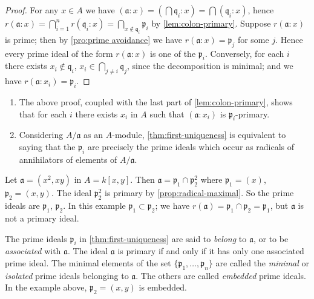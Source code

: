 \begin{proof}
    For any $x \in A$ we have $(\mathfrak{a} : x) = \left(\bigcap \mathfrak{q}_i : x\right) = \bigcap (\mathfrak{q}_i : x)$, hence $r(\mathfrak{a} : x) = \bigcap_{i=1}^n r(\mathfrak{q}_i : x) = \bigcap_{x \notin \mathfrak{q}_i} \mathfrak{p}_i$ by \eqref{lem:colon-primary}. Suppose $r(\mathfrak{a} : x)$ is prime; then by \eqref{pro:prime avoidance} we have $r(\mathfrak{a} : x) = \mathfrak{p}_j$ for some $j$. Hence every prime ideal of the form $r(\mathfrak{a} : x)$ is one of the $\mathfrak{p}_i$. Conversely, for each $i$ there exists $x_i \notin \mathfrak{q}_i$, $x_i \in \bigcap_{j \neq i} \mathfrak{q}_j$, since the decomposition is minimal; and we have $r(\mathfrak{a} : x_i) = \mathfrak{p}_i$.
\end{proof}
\begin{remarks}\label{rem:first-uniqueness}
    \begin{enumerate}[1)]
        \item The above proof, coupled with the last part of \eqref{lem:colon-primary}, shows that for each $i$ there exists $x_i$ in $A$ such that $(\mathfrak{a} : x_i)$ is $\mathfrak{p}_i$-primary.
        \item Considering $A/\mathfrak{a}$ as an $A$-module, \eqref{thm:first-uniqueness} is equivalent to saying that the $\mathfrak{p}_i$ are precisely the prime ideals which occur as radicals of annihilators of elements of $A/\mathfrak{a}$.
    \end{enumerate}
\end{remarks}

\begin{example}\label{ex:embedded-primes}
    Let $\mathfrak{a} = (x^2, xy)$ in $A = k[x, y]$. Then $\mathfrak{a} = \mathfrak{p}_1 \cap \mathfrak{p}_2^2$ where $\mathfrak{p}_1 = (x)$, $\mathfrak{p}_2 = (x, y)$. The ideal $\mathfrak{p}_2^2$ is primary by \eqref{prop:radical-maximal}. So the prime ideals are $\mathfrak{p}_1$, $\mathfrak{p}_2$. In this example $\mathfrak{p}_1 \subset \mathfrak{p}_2$; we have $r(\mathfrak{a}) = \mathfrak{p}_1 \cap \mathfrak{p}_2 = \mathfrak{p}_1$, but $\mathfrak{a}$ is not a primary ideal.
\end{example}

The prime ideals $\mathfrak{p}_i$ in \eqref{thm:first-uniqueness} are said to \emph{belong} to $\mathfrak{a}$, or to be \emph{associated} with $\mathfrak{a}$. The ideal $\mathfrak{a}$ is primary if and only if it has only one associated prime ideal. The minimal elements of the set $\{\mathfrak{p}_1, \ldots, \mathfrak{p}_n\}$ are called the \emph{minimal} or \emph{isolated} prime ideals belonging to $\mathfrak{a}$. The others are called \emph{embedded} prime ideals. In the example above, $\mathfrak{p}_2 = (x, y)$ is embedded.

